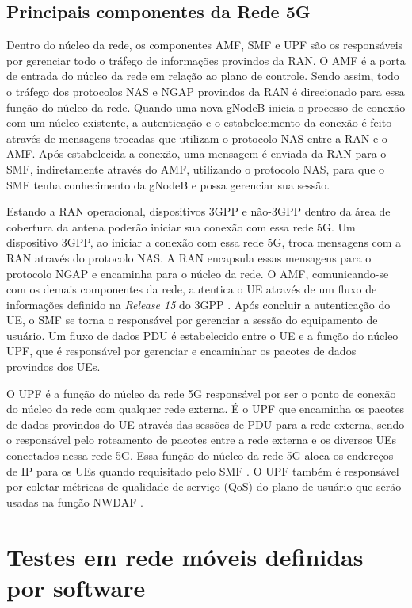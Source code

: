 \subsection{Principais componentes da Rede 5G}
\label{sub:components}

Dentro do núcleo da rede, os componentes AMF, SMF e UPF são os responsáveis por gerenciar todo o tráfego de informações provindos da RAN.
O AMF é a porta de entrada do núcleo da rede em relação ao plano de controle.
Sendo assim, todo o tráfego dos protocolos NAS e NGAP provindos da RAN é direcionado para essa função do núcleo da rede.
Quando uma nova gNodeB inicia o processo de conexão com um núcleo existente, a autenticação e o estabelecimento da conexão é feito através de mensagens trocadas que utilizam o protocolo NAS entre a RAN e o AMF.
Após estabelecida a conexão, uma mensagem é enviada da RAN para o SMF, indiretamente através do AMF, utilizando o protocolo NAS, para que o SMF tenha conhecimento da gNodeB e possa gerenciar sua sessão.

Estando a RAN operacional, dispositivos 3GPP e não-3GPP dentro da área de cobertura da antena poderão iniciar sua conexão com essa rede 5G. Um dispositivo 3GPP, ao iniciar a conexão com essa rede 5G, troca mensagens com a RAN através do protocolo NAS. A RAN encapsula essas mensagens para o protocolo NGAP e encaminha para o núcleo da rede. O AMF, comunicando-se com os demais componentes da rede, autentica o UE através de um fluxo de informações definido na \textit{Release 15} do 3GPP \cite{3gpp.29.509}. Após concluir a autenticação do UE, o SMF se torna o responsável por gerenciar a sessão do equipamento de usuário. Um fluxo de dados PDU é estabelecido entre o UE e a função do núcleo UPF, que é responsável por gerenciar e encaminhar os pacotes de dados provindos dos UEs.

O UPF é a função do núcleo da rede 5G responsável por ser o ponto de conexão do núcleo da rede com qualquer rede externa.
É o UPF que encaminha os pacotes de dados provindos do UE através das sessões de PDU para a rede externa, sendo o responsável pelo roteamento de pacotes entre a rede externa e os diversos UEs conectados nessa rede 5G.
Essa função do núcleo da rede 5G aloca os endereços de IP para os UEs quando requisitado pelo SMF \cite{3gpp.23.501}.
O UPF também é responsável por coletar métricas de qualidade de serviço (QoS) do plano de usuário que serão usadas na função NWDAF \cite{3gpp.23.548}.

\section{Testes em rede móveis definidas por software}

